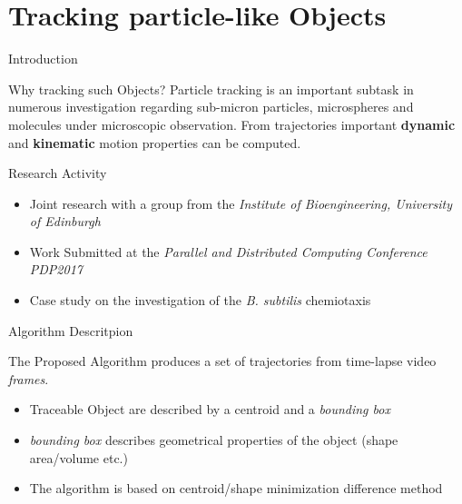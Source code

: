 \documentclass{beamer}
\begin{document}
\section{Tracking particle-like Objects}



  \begin{frame}{Introduction}
		\begin{exampleblock}{Why tracking such Objects?}
		Particle tracking is an important subtask in numerous investigation regarding sub-micron particles, microspheres and molecules under microscopic observation.
		From trajectories important \textbf{dynamic} and \textbf{kinematic} motion properties can be computed.
			
		\end{exampleblock}		

		\begin{alertblock}{Research Activity}
			
		\begin{itemize}
			 \item Joint research with a group from the \textit{Institute of Bioengineering, University of Edinburgh}
			 \item Work Submitted at the \textit{Parallel and Distributed Computing Conference PDP2017}
			 \item Case study on the investigation of the \textit{B. subtilis} chemiotaxis

			\end{itemize}
			
		\end{alertblock}	
		
\end{frame} %


  \begin{frame}{Algorithm Descritpion}
		\begin{exampleblock}{The Proposed Algorithm}
			 produces a set of trajectories from time-lapse video \textit{frames}. 
			\begin{itemize}
				\item Traceable Object are described by a centroid and a \textit{bounding box}
				\item \textit{bounding box} describes geometrical properties of the object (shape area/volume etc.)
				\item The algorithm is based on centroid/shape minimization difference method
			\end{itemize}
			
		\end{exampleblock}		

		
		
\end{frame} %
\end{document}
